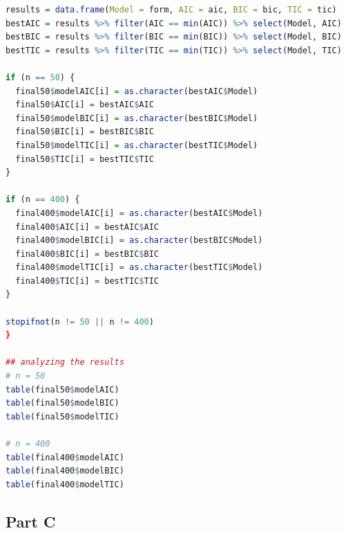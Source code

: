 \documentclass[paper=a4, fontsize=11pt]{scrartcl} %
\numberwithin{equation}{section} %
\begin{document}
\begin{lstlisting}[language = R, frame = single]
results = data.frame(Model = form, AIC = aic, BIC = bic, TIC = tic)
bestAIC = results %>% filter(AIC == min(AIC)) %>% select(Model, AIC)
bestBIC = results %>% filter(BIC == min(BIC)) %>% select(Model, BIC)
bestTIC = results %>% filter(TIC == min(TIC)) %>% select(Model, TIC)

if (n == 50) { 
  final50$modelAIC[i] = as.character(bestAIC$Model)
  final50$AIC[i] = bestAIC$AIC
  final50$modelBIC[i] = as.character(bestBIC$Model)
  final50$BIC[i] = bestBIC$BIC
  final50$modelTIC[i] = as.character(bestTIC$Model)
  final50$TIC[i] = bestTIC$TIC
} 

if (n == 400) { 
  final400$modelAIC[i] = as.character(bestAIC$Model)
  final400$AIC[i] = bestAIC$AIC
  final400$modelBIC[i] = as.character(bestBIC$Model)
  final400$BIC[i] = bestBIC$BIC
  final400$modelTIC[i] = as.character(bestTIC$Model)
  final400$TIC[i] = bestTIC$TIC
}

stopifnot(n != 50 || n != 400)
}

## analyzing the results
# n = 50
table(final50$modelAIC)
table(final50$modelBIC)
table(final50$modelTIC)

# n = 400
table(final400$modelAIC)
table(final400$modelBIC)
table(final400$modelTIC)
\end{lstlisting}

\subsection{Part C}
\end{document}
